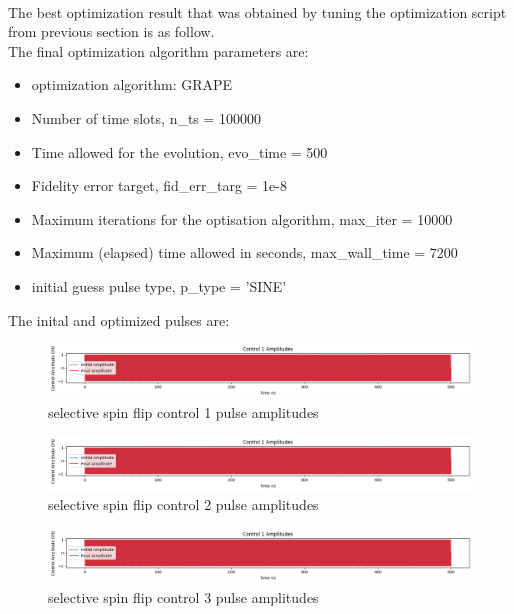 \documentclass{article}
\begin{document}
\\

The best optimization result that was obtained by tuning the optimization script from 
previous section is as follow. 
\\
The final optimization algorithm parameters are:
\\ 
\begin{itemize}
    \item optimization algorithm: GRAPE
    \item Number of time slots, n\_ts = 100000
    \item Time allowed for the evolution, evo\_time = 500
    \item Fidelity error target, fid\_err\_targ = 1e-8
    \item Maximum iterations for the optisation algorithm, max\_iter = 10000
    \item Maximum (elapsed) time allowed in seconds, max\_wall\_time = 7200
    \item initial guess pulse type, p\_type = 'SINE'
\end{itemize}

The inital and optimized pulses are: 
\begin{figure}[H]
    \centering
    \includegraphics[width=0.6\linewidth]{selective_spin_flip_GRAPE_control1.png}
    \caption{selective spin flip control 1 pulse amplitudes}
    \label{fig:selective_spin_flip_control1}
\end{figure}
\begin{figure}[H]
    \centering
    \includegraphics[width=0.6\linewidth]{selective_spin_flip_GRAPE_control1.png}
    \caption{selective spin flip control 2 pulse amplitudes}
    \label{fig:selective_spin_flip_control2}
\end{figure}
\begin{figure}[H]
    \centering
    \includegraphics[width=0.6\linewidth]{selective_spin_flip_GRAPE_control1.png}
    \caption{selective spin flip control 3 pulse amplitudes}
    \label{fig:selective_spin_flip_control3}
\end{figure}
\end{document}
